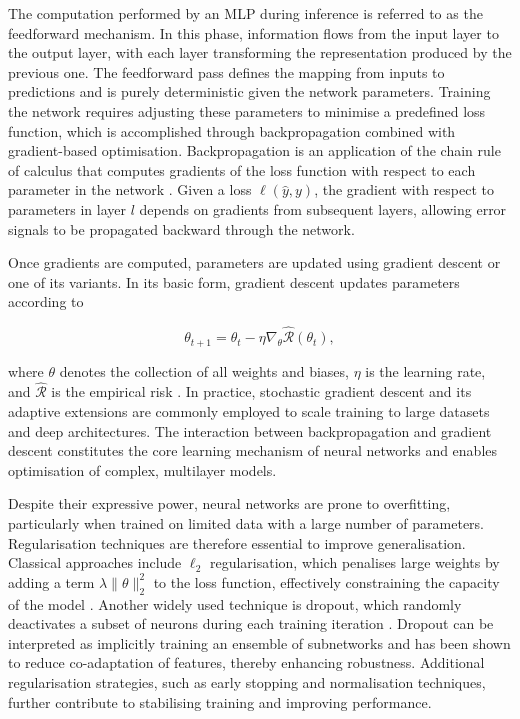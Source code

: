 The computation performed by an MLP during inference is referred to as the feedforward mechanism. In this phase, information flows from the input layer to the output layer, with each layer transforming the representation produced by the previous one. The feedforward pass defines the mapping from inputs to predictions and is purely deterministic given the network parameters. Training the network requires adjusting these parameters to minimise a predefined loss function, which is accomplished through backpropagation combined with gradient-based optimisation. Backpropagation is an application of the chain rule of calculus that computes gradients of the loss function with respect to each parameter in the network \cite{Rumelhart1986}. Given a loss $\ell(\hat{y}, y)$, the gradient with respect to parameters in layer $l$ depends on gradients from subsequent layers, allowing error signals to be propagated backward through the network.

Once gradients are computed, parameters are updated using gradient descent or one of its variants. In its basic form, gradient descent updates parameters according to

\begin{equation}
    \theta_{t+1} = \theta_t - \eta \nabla_\theta \hat{\mathcal{R}}(\theta_t),
\end{equation}

where $\theta$ denotes the collection of all weights and biases, $\eta$ is the learning rate, and $\hat{\mathcal{R}}$ is the empirical risk \cite{Bishop2006}. In practice, stochastic gradient descent and its adaptive extensions are commonly employed to scale training to large datasets and deep architectures. The interaction between backpropagation and gradient descent constitutes the core learning mechanism of neural networks and enables optimisation of complex, multilayer models.

Despite their expressive power, neural networks are prone to overfitting, particularly when trained on limited data with a large number of parameters. Regularisation techniques are therefore essential to improve generalisation. Classical approaches include $\ell_2$ regularisation, which penalises large weights by adding a term $\lambda \|\theta\|_2^2$ to the loss function, effectively constraining the capacity of the model \cite{Hastie2009}. Another widely used technique is dropout, which randomly deactivates a subset of neurons during each training iteration \cite{Srivastava2014}. Dropout can be interpreted as implicitly training an ensemble of subnetworks and has been shown to reduce co-adaptation of features, thereby enhancing robustness. Additional regularisation strategies, such as early stopping and normalisation techniques, further contribute to stabilising training and improving performance.

